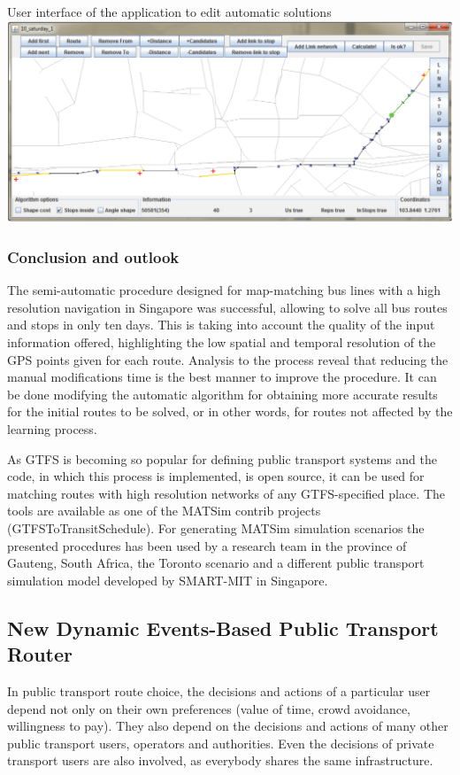 \createfigure
{}
{User interface of the application to edit automatic solutions}
{\label{fig:Application}}
{\includegraphics[width=1.0\textwidth]{extending/figures/semiAuto/Application.png}}
{}

\subsubsection{Conclusion and outlook}

The semi-automatic procedure designed for map-matching bus lines with a high resolution navigation in Singapore was successful, allowing to solve all bus routes and stops in only ten days. This is taking into account the quality of the input information offered, highlighting the low spatial and temporal resolution of the GPS points given for each route. Analysis to the process reveal that reducing the manual modifications time is the best manner to improve the procedure. It can be done modifying the automatic algorithm for obtaining more accurate results for the initial routes to be solved, or in other words, for routes not affected by the learning process.

As GTFS is becoming so popular for defining public transport systems and the code, in which this process is implemented, is open source, it can be used for matching routes with high resolution networks of any GTFS-specified place. The tools are available as one of the MATSim contrib projects (GTFSToTransitSchedule). For generating MATSim simulation scenarios the presented procedures has been used by a research team in the province of Gauteng, South Africa, the Toronto scenario and a different public transport simulation model developed by SMART-MIT in Singapore.

\subsection{New Dynamic Events-Based Public Transport Router}
\citet[][]{OrdonezErath_TechRep_FCL_2013}
In public transport route choice, the decisions and actions of a particular user depend not only on their own preferences (value of time, crowd avoidance, willingness to pay). They also depend on the decisions and actions of many other public transport users, operators and authorities. Even the decisions of private transport users are also involved, as everybody shares the same infrastructure.


